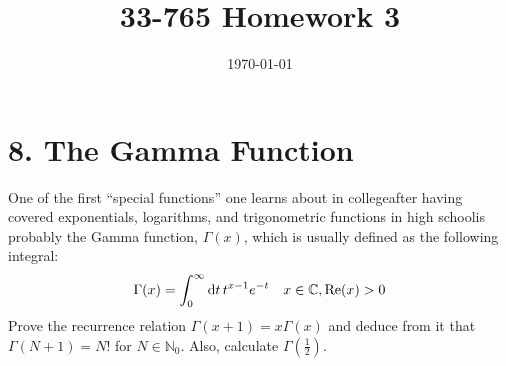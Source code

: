 \documentclass[a4paper,twoside]{article}
\title{33-765 Homework 3}
\date{\today}
\begin{document}
\maketitle

\section*{8. The Gamma Function}
One of the first ``special functions'' one learns about in college\textemdash after having covered exponentials, logarithms, and trigonometric functions in high school\textemdash is probably the Gamma function, $ \Gamma(x) $, which is usually defined as the following integral:
\begin{equation}
    \Gamma(x) = \int_{0}^{\infty} \dd{t} t^{x - 1} e^{-t} \quad x \in \mathbb{C}, \Re(x) > 0
\end{equation}
Prove the recurrence relation $ \Gamma(x+1) = x \Gamma(x) $ and deduce from it that $ \Gamma(N + 1) = N! $ for $ N \in \mathbb{N}_0 $. Also, calculate $ \Gamma\left( \frac{1}{2} \right) $.
\end{document}
